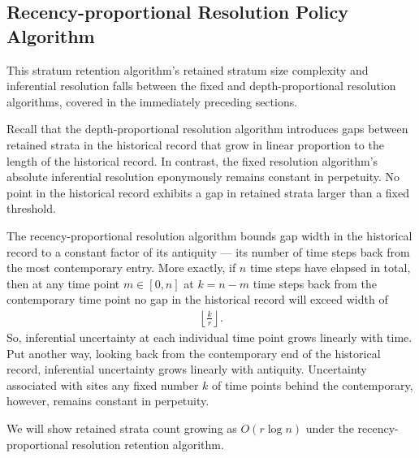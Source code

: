 \subsection{Recency-proportional Resolution Policy Algorithm}
\label{sec:recency-proportional-resolution-algo}

This stratum retention algorithm's retained stratum size complexity and inferential resolution falls between the fixed and depth-proportional resolution algorithms, covered in the immediately preceding sections.

Recall that the depth-proportional resolution algorithm introduces gaps between retained strata in the historical record that grow in linear proportion to the length of the historical record.
In contrast, the fixed resolution algorithm's absolute inferential resolution eponymously remains constant in perpetuity.
No point in the historical record exhibits a gap in retained strata larger than a fixed threshold.

The recency-proportional resolution algorithm bounds gap width in the historical record to a constant factor of its antiquity --- its number of time steps back from the most contemporary entry.
More exactly, if $n$ time steps have elapsed in total, then at any time point $m \in [0, n]$ at $k = n - m$ time steps back from the contemporary time point no gap in the historical record will exceed width of
\begin{align}
  \left\lfloor \frac{k}{r} \right\rfloor.
  \label{eqn:rpr-gap}
\end{align}
So, inferential uncertainty at each individual time point grows linearly with time.
Put another way, looking back from the contemporary end of the historical record, inferential uncertainty grows linearly with antiquity.
Uncertainty associated with sites any fixed number $k$ of time points behind the contemporary, however, remains constant in perpetuity.

We will show retained strata count growing as $O(r\log{n})$ under the recency-proportional resolution retention algorithm.

